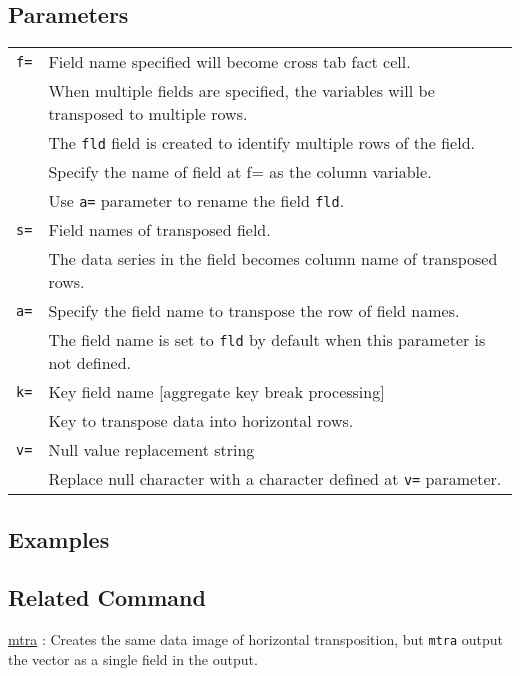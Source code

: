 \subsection*{Parameters}
\begin{table}[htbp]
{\small
\begin{tabular}{ll}
\verb|f=|    & Field name specified will become cross tab fact cell. \\
	    & When multiple fields are specified, the variables will be transposed to multiple rows. \\
	    & The \verb|fld| field is created to identify multiple rows of the field. \\  
             & Specify the name of field at f= as the column variable. \\ 
             & Use \verb|a=| parameter to rename the field \verb|fld|. \\
\verb|s=|    & Field names of transposed field.  \\
             & The data series in the field becomes column name of transposed rows.\\
\verb|a=|    & Specify the field name to transpose the row of field names. \\
             & The field name is set to \verb|fld| by default when this parameter is not defined. \\
\verb|k=|    & Key field name [aggregate key break processing]\\
             & Key to transpose data into horizontal rows. \\
\verb|v=|    & Null value replacement string \\
             & Replace null character with a character defined at \verb|v=| parameter. \\
\end{tabular} 
}
\end{table} 


\subsection*{Examples}


\subsection*{Related Command}
\hyperref[sect:mtra]{mtra} : Creates the same data image of horizontal transposition, but \verb|mtra| output the vector as a single field in the output. \\


%
